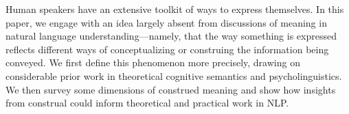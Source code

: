 Human speakers have an extensive toolkit of ways to express themselves. In this paper, we engage with an idea largely absent from discussions of meaning in natural language understanding—namely, that the way something is expressed reflects different ways of conceptualizing or construing the information being conveyed. We first define this phenomenon more precisely, drawing on considerable prior work in theoretical cognitive semantics and psycholinguistics. We then survey some dimensions of construed meaning and show how insights from construal could inform theoretical and practical work in NLP.
